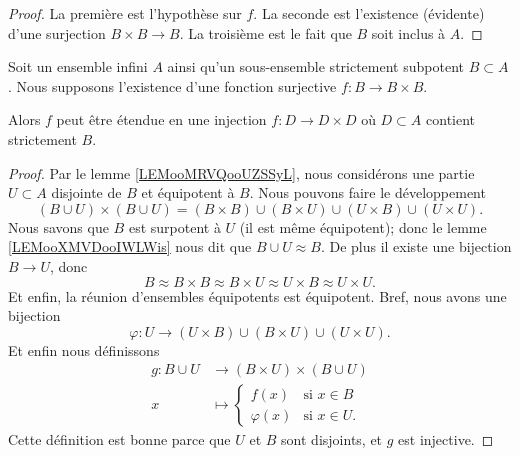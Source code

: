 \begin{proof}
    La première est l'hypothèse sur \( f\). La seconde est l'existence (évidente) d'une surjection \( B\times B\to B\). La troisième est le fait que \( B\) soit inclus à \( A\).
\end{proof}

\begin{lemma}     \label{LEMooPOEFooXaifhT}
    Soit un ensemble infini \( A\) ainsi qu'un sous-ensemble strictement subpotent \( B\subset A\). Nous supposons l'existence d'une fonction surjective \( f\colon B\to B\times B\).

    Alors \( f\) peut être étendue en une injection \( f\colon D\to D\times D\) où \( D\subset A\) contient strictement \( B\).
\end{lemma}

\begin{proof}
    Par le lemme \ref{LEMooMRVQooUZSSyL}, nous considérons une partie \( U\subset A\) disjointe de \( B\) et équipotent à \( B\). Nous pouvons faire le développement
    \begin{equation}
        (B\cup U)\times (B\cup U)=(B\times B)\cup(B\times U)\cup (U\times B)\cup (U\times U).
    \end{equation}
    Nous savons que \( B\) est surpotent à \( U\) (il est même équipotent); donc le lemme \ref{LEMooXMVDooIWLWis} nous dit que \( B\cup U\approx B\). De plus il existe une bijection \( B\to U\), donc 
    \begin{equation}
        B\approx B\times B\approx B\times U\approx U\times B\approx U\times U.
    \end{equation}
    Et enfin, la réunion d'ensembles équipotents est équipotent. Bref, nous avons une bijection
    \begin{equation}
        \varphi\colon U\to (U\times B)\cup (B\times U)\cup (U\times U).
    \end{equation}
    Et enfin nous définissons
    \begin{equation}
        \begin{aligned}
            g\colon B\cup U&\to (B\times U)\times (B\cup U) \\
            x&\mapsto \begin{cases}
                f(x)    &   \text{si }  x\in B\\
                \varphi(x)    &    \text{si } x\in U.
            \end{cases}
        \end{aligned}
    \end{equation}
    Cette définition est bonne parce que \( U\) et \( B\) sont disjoints, et \( g\) est injective.
\end{proof}


